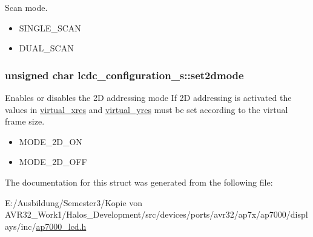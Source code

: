 Scan mode. 

\begin{itemize}
\item SINGLE\_\-SCAN \item DUAL\_\-SCAN \end{itemize}
\hypertarget{structlcdc__configuration__s_67cfa60b1c4a0f5ac452de527f7d3563}{
\subsubsection[{set2dmode}]{\setlength{\rightskip}{0pt plus 5cm}unsigned char {\bf lcdc\_\-configuration\_\-s::set2dmode}}}
\label{structlcdc__configuration__s_67cfa60b1c4a0f5ac452de527f7d3563}


Enables or disables the 2D addressing mode If 2D addressing is activated the values in \hyperlink{structlcdc__configuration__s_0b732746f63d5191f561b71be3f0d377}{virtual\_\-xres} and \hyperlink{structlcdc__configuration__s_26201aad2ad05301e6dd06ed5c174bbe}{virtual\_\-yres} must be set according to the virtual frame size. 

\begin{itemize}
\item MODE\_\-2D\_\-ON \item MODE\_\-2D\_\-OFF \end{itemize}


The documentation for this struct was generated from the following file:\begin{CompactItemize}
\item 
E:/Ausbildung/Semester3/Kopie von AVR32\_\-Work1/Halos\_\-Development/src/devices/ports/avr32/ap7x/ap7000/displays/inc/\hyperlink{ap7000__lcd_8h}{ap7000\_\-lcd.h}\end{CompactItemize}
